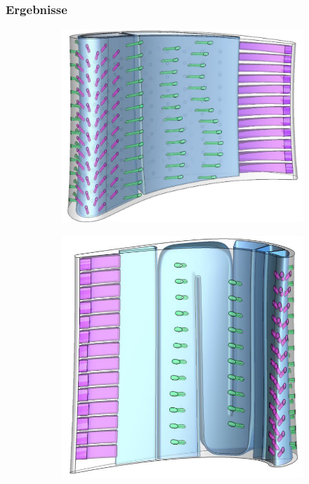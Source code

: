 \documentclass[8pt, aspectratio=169]{beamer}
\begin{document}
\begin{frame}
	\frametitle{Ergebnisse}
	\vspace{-1cm}\hspace{-0.5cm}
	\begin{figure}
		\centering
		\begin{subfigure}[t]{.49\textwidth}
			\centering
			\includegraphics[height=.6\textheight]{../tec/complete/17.png}
		\end{subfigure}
		\begin{subfigure}[t]{.49\textwidth}
			\centering
			\includegraphics[height=.6\textheight]{../tec/complete/18.png}
		\end{subfigure}
	\end{figure}
	\vfill
\end{frame}
\end{document}
